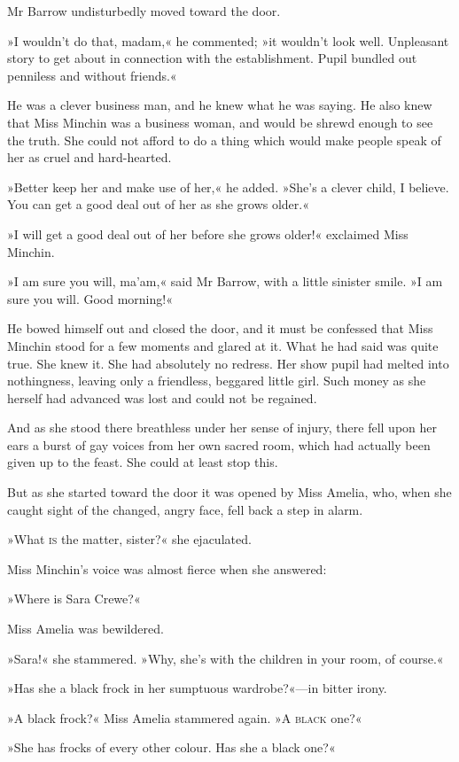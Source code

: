 Mr Barrow undisturbedly moved toward the door.

»I wouldn't do that, madam,« he commented; »it wouldn't look well. Unpleasant story to get about in connection with the establishment. Pupil bundled out penniless and without friends.«

He was a clever business man, and he knew what he was saying. He also knew that Miss Minchin was a business woman, and would be shrewd enough to see the truth. She could not afford to do a thing which would make people speak of her as cruel and hard-hearted.

»Better keep her and make use of her,« he added. »She's a clever child, I believe. You can get a good deal out of her as she grows older.«

»I will get a good deal out of her before she grows older!« exclaimed Miss Minchin.

»I am sure you will, ma'am,« said Mr Barrow, with a little sinister smile. »I am sure you will. Good morning!«

He bowed himself out and closed the door, and it must be confessed that Miss Minchin stood for a few moments and glared at it. What he had said was quite true. She knew it. She had absolutely no redress. Her show pupil had melted into nothingness, leaving only a friendless, beggared little girl. Such money as she herself had advanced was lost and could not be regained.

And as she stood there breathless under her sense of injury, there fell upon her ears a burst of gay voices from her own sacred room, which had actually been given up to the feast. She could at least stop this.

But as she started toward the door it was opened by Miss Amelia, who, when she caught sight of the changed, angry face, fell back a step in alarm.

»What \textsc{is} the matter, sister?« she ejaculated.

Miss Minchin's voice was almost fierce when she answered:

»Where is Sara Crewe?«

Miss Amelia was bewildered.

»Sara!« she stammered. »Why, she's with the children in your room, of course.«

»Has she a black frock in her sumptuous wardrobe?«—in bitter irony.

»A black frock?« Miss Amelia stammered again. »A \textsc{black} one?«

»She has frocks of every other colour. Has she a black one?«

